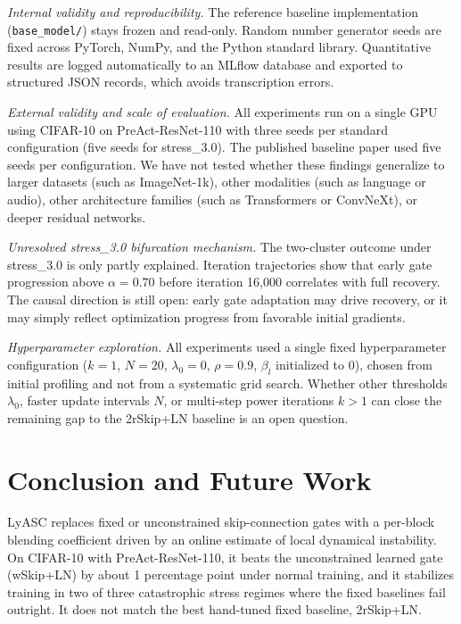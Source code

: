 \documentclass[conference,10pt]{IEEEtran}
\begin{document}
\textit{Internal validity and reproducibility.}
The reference baseline implementation (\texttt{base\_model/}) stays frozen and
read-only. Random number generator seeds are fixed across PyTorch, NumPy, and
the Python standard library. Quantitative results are logged automatically to
an MLflow database and exported to structured JSON records, which avoids
transcription errors.

\textit{External validity and scale of evaluation.}
All experiments run on a single GPU using CIFAR-10 on PreAct-ResNet-110 with
three seeds per standard configuration (five seeds for stress\_3.0). The
published baseline paper used five seeds per configuration. We have not
tested whether these findings generalize to larger datasets (such as
ImageNet-1k), other modalities (such as language or audio), other
architecture families (such as Transformers or ConvNeXt), or deeper
residual networks.

\textit{Unresolved stress\_3.0 bifurcation mechanism.}
The two-cluster outcome under stress\_3.0 is only partly explained.
Iteration trajectories show that early gate progression above $\alpha = 0.70$
before iteration 16,000 correlates with full recovery. The causal direction
is still open: early gate adaptation may drive recovery, or it may simply
reflect optimization progress from favorable initial gradients.

\textit{Hyperparameter exploration.}
All experiments used a single fixed hyperparameter configuration ($k = 1$,
$N = 20$, $\lambda_0 = 0$, $\rho = 0.9$, $\beta_l$ initialized to 0), chosen
from initial profiling and not from a systematic grid search. Whether other
thresholds $\lambda_0$, faster update intervals $N$, or multi-step power
iterations $k > 1$ can close the remaining gap to the 2rSkip+LN baseline is
an open question.



\section{Conclusion and Future Work}

LyASC replaces fixed or unconstrained skip-connection gates with a
per-block blending coefficient driven by an online estimate of local
dynamical instability. On CIFAR-10 with PreAct-ResNet-110, it beats the
unconstrained learned gate (wSkip+LN) by about 1 percentage point under
normal training, and it stabilizes training in two of three catastrophic
stress regimes where the fixed baselines fail outright. It does not
match the best hand-tuned fixed baseline, 2rSkip+LN.
\end{document}
